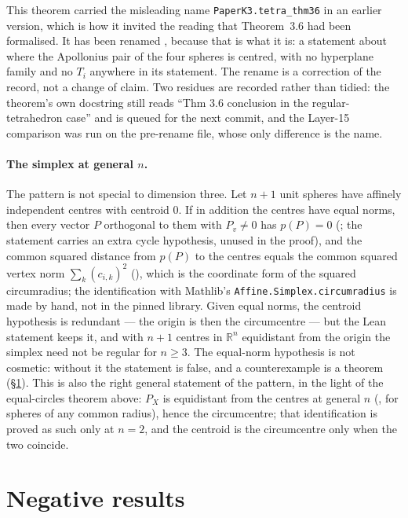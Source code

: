 \documentclass[11pt]{article}
\theoremstyle{definition}
\theoremstyle{remark}
\newcommand{\RR}{\mathbb{R}}
\begin{document}
This theorem carried the misleading name \texttt{PaperK3.tetra\_thm36} in an earlier version, which is
how it invited the reading that Theorem~3.6 had been formalised. It has been renamed
, because that is what it is: a statement about where the
Apollonius pair of the four spheres is centred, with no hyperplane family and no $T_i$ anywhere in
its statement. The rename is a correction of the record, not a change of claim. Two residues are recorded rather
than tidied: the theorem's own docstring still reads ``Thm 3.6 conclusion in the regular-tetrahedron
case'' and is queued for the next commit, and the Layer-15 comparison was run on the pre-rename file,
whose only difference is the name.

\paragraph{The simplex at general $n$.} The pattern is not special to dimension three. Let
$n+1$ unit spheres have affinely independent centres with centroid $0$. If in addition the centres
have equal norms, then every vector $P$ orthogonal to them with $P_v\neq0$ has $p(P)=0$
(; the statement carries an extra cycle hypothesis, unused in the proof), and
the common squared distance from $p(P)$ to the centres equals the common squared vertex norm
$\sum_k (c_{i,k})^2$ (), which is the coordinate form of the
squared circumradius; the identification with Mathlib's \texttt{Affine.Simplex.circumradius} is made
by hand, not in the pinned library. Given equal norms, the centroid hypothesis is redundant --- the
origin is then the circumcentre --- but the Lean statement keeps it, and with $n+1$ centres in
$\RR^n$ equidistant from the origin the simplex need not be regular for $n\ge3$. The equal-norm hypothesis is not
cosmetic: without it the statement is false, and a counterexample is a theorem
(\S\ref{sec:negative}). This is also the right general statement of the pattern, in the light of the
equal-circles theorem above: $P_X$ is equidistant from the centres at general $n$
(, for spheres of any common radius), hence the circumcentre; that
identification is proved as such only at $n=2$, and the centroid is the circumcentre only when the two
coincide.

\section{Negative results}\label{sec:negative}
\end{document}
